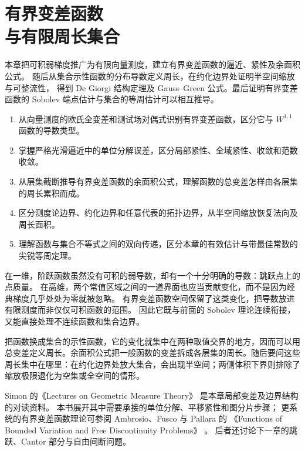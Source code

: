 \chapter[有界变差函数与有限周长集合]{有界变差函数\\与有限周长集合}
\label{b1:ch:27}
\begin{chapterabstract}
本章把可积弱梯度推广为有限向量测度，建立有界变差函数的逼近、紧性及余面积公式。
随后从集合示性函数的分布导数定义周长，在约化边界处证明半空间缩放与可整流性，
得到 De Giorgi 结构定理及 Gauss–Green 公式。最后证明有界变差函数的 Sobolev 端点估计与集合的等周估计可以相互推导。
\end{chapterabstract}

\begin{learninggoals}
\begin{enumerate}
\item 从向量测度的欧氏全变差和测试场对偶式识别有界变差函数，区分它与 \(W^{1,1}\) 函数的导数类型。
\item 掌握严格光滑逼近中的单位分解误差，区分局部紧性、全域紧性、\WeakStar{}收敛和范数收敛。
\item 从层集截断推导有界变差函数的余面积公式，理解函数的总变差怎样由各层集的周长累积而成。
\item 区分测度论边界、约化边界和任意代表的拓扑边界，从半空间缩放恢复法向及周长面积。
\item 理解函数与集合不等式之间的双向传递，区分本章的有效估计与带最佳常数的尖锐等周定理。
\end{enumerate}
\end{learninggoals}

在一维，阶跃函数虽然没有可积的弱导数，却有一个十分明确的导数：跳跃点上的点质量。
在高维，两个常值区域之间的一道界面也应当贡献变化，而不是因为经典梯度几乎处处为零就被忽略。
有界变差函数空间保留了这类变化，把导数放进有限测度而非仅仅可积函数的范围。
因此它既与前面的 Sobolev 理论连续衔接，又能直接处理不连续函数和集合边界。

\ProseParagraphBreak

把函数换成集合的示性函数，它的变化就集中在两种取值交界的地方，因而可以用总变差定义周长。余面积公式把一般函数的变差拆成各层集的周长。随后要问这些周长集中在哪里：在约化边界处放大集合，会出现半空间；两侧体积下界则排除了缩放极限退化为空集或全空间的情形。

\ProseParagraphBreak

Simon 的《Lectures on Geometric Measure Theory》%
\cite[\S\S6 and 14]{Simon1983Lectures}是本章局部变差及边界结构的对读资料。
本书展开其中需要承接的单位分解、平移紧性和图分片步骤；
更系统的有界变差函数理论可参阅 Ambrosio、Fusco 与 Pallara 的%
《Functions of Bounded Variation and Free Discontinuity Problems》%
\cite{Ambrosio2000Functions}。
后者还讨论下一章的跳跃、Cantor 部分与自由间断问题。

